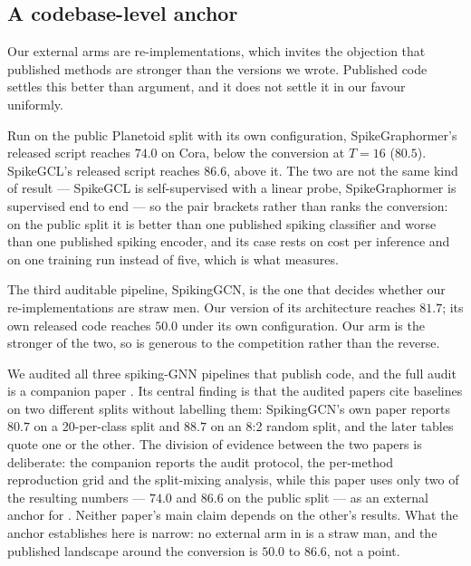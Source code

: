

\subsection{A codebase-level anchor}
\label{sec:audit}

Our external arms are re-implementations, which invites the objection that published methods are
stronger than the versions we wrote. Published code settles this better than argument, and it does
not settle it in our favour uniformly.

Run on the public Planetoid split with its own configuration, SpikeGraphormer's released script
reaches $74.0$ on Cora, below the conversion at $T=16$ ($80.5$). SpikeGCL's released script reaches
$86.6$, above it. The two are not the same kind of result --- SpikeGCL is self-supervised with a
linear probe, SpikeGraphormer is supervised end to end --- so the pair brackets rather than ranks the
conversion: on the public split it is better than one published spiking classifier and worse than one
published spiking encoder, and its case rests on cost per inference and on one training run instead of
five, which is what  measures.

The third auditable pipeline, SpikingGCN, is the one that decides whether our re-implementations are
straw men. Our version of its architecture reaches $81.7$; its own released code reaches $50.0$ under
its own configuration. Our arm is the stronger of the two, so  is generous to the
competition rather than the reverse.

We audited all three spiking-GNN pipelines that publish code, and the full audit is a companion
paper \citep{companion}. Its central finding is that the audited papers cite baselines on two
different splits without labelling them: SpikingGCN's own paper reports $80.7$ on a 20-per-class
split and $88.7$ on an 8:2 random split, and the later tables quote one or the other. The division
of evidence between the two papers is deliberate: the companion reports the audit protocol, the
per-method reproduction grid and the split-mixing analysis, while this paper uses only two of the
resulting numbers --- $74.0$ and $86.6$ on the public split --- as an external anchor for
. Neither paper's main claim depends on the other's results. What the anchor
establishes here is narrow: no external arm in  is a straw man, and the published
landscape around the conversion is $50.0$ to $86.6$, not a point.

